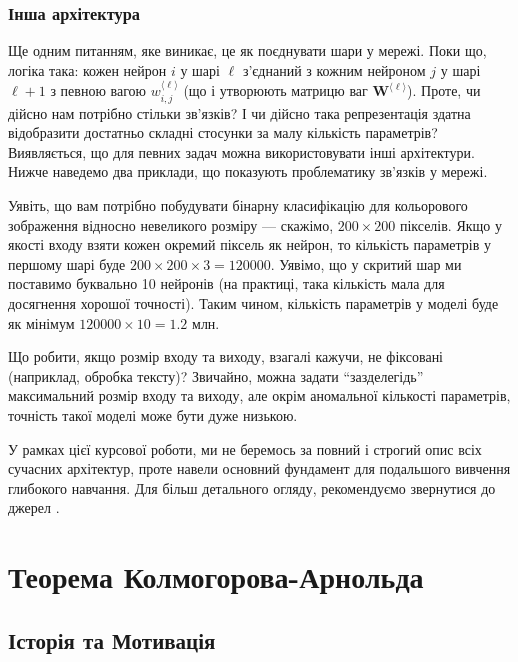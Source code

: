 \subsubsection{Інша архітектура}

Ще одним питанням, яке виникає, це як поєднувати шари у мережі. Поки що, логіка
така: кожен нейрон $i$ у шарі $\ell$ з'єднаний з кожним нейроном $j$ у шарі
$\ell+1$ з певною вагою $w_{i,j}^{\langle \ell \rangle}$ (що і утворюють матрицю
ваг $\boldsymbol{W}^{\langle \ell \rangle}$). Проте, чи дійсно нам потрібно 
стільки зв'язків? І чи дійсно така репрезентація здатна відобразити достатньо
складні стосунки за малу кількість параметрів? Виявляється, що для певних задач
можна використовувати інші архітектури. Нижче наведемо два приклади, що 
показують проблематику зв'язків у мережі.

\begin{example}
	Уявіть, що вам потрібно побудувати бінарну класифікацію для кольорового
	зображення відносно невеликого розміру --- скажімо, $200 \times 200$
	пікселів. Якщо у якості входу взяти кожен окремий піксель як нейрон, то
	кількість параметрів у першому шарі буде $200 \times 200 \times 3 = 120000$.
	Уявімо, що у скритий шар ми поставимо буквально 10 нейронів (на практиці,
	така кількість мала для досягнення хорошої точності). Таким чином, кількість
	параметрів у моделі буде як мінімум $120000 \times 10 = 1.2$ млн. 
\end{example}

\begin{example}
	Що робити, якщо розмір входу та виходу, взагалі кажучи, не фіксовані 
	(наприклад, обробка тексту)? Звичайно, можна задати ``зазделегідь''
	максимальний розмір входу та виходу, але окрім аномальної кількості
	параметрів, точність такої моделі може бути дуже низькою.
\end{example}

У рамках цієї курсової роботи, ми не беремось за повний і строгий опис всіх
сучасних архітектур, проте навели основний фундамент для подальшого вивчення
глибокого навчання. Для більш детального огляду, рекомендуємо звернутися до
джерел \cite{book-1,book-2}.

\section{Теорема Колмогорова-Арнольда}

\subsection{Історія та Мотивація}

